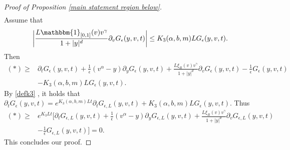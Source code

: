 \documentclass[11pt]{article}
\numberwithin{equation}{section}
\begin{document}
\begin{proof}[Proof of Proposition \ref{main statement region below}]
\begin{align*}
\end{align*}
Assume that 
\begin{align}\label{bound derivative by function}
    \bigg|\frac{L\mathbbm{1}_{[0,1]}(v)v^{\gamma}}{1+|y|^{d}}\partial_{v}G_{\epsilon}(y,v,t)\bigg|\leq K_{3}(\alpha,b,m)L G_{\epsilon}(y,v,t).
\end{align}
Then 
\begin{align*}
    (\ast) \geq &\partial_{t}G_{\epsilon}(y,v,t)+\frac{1}{\epsilon}(v^{\alpha}-y)\partial_{y}G_{\epsilon}(y,v,t)+\frac{L\xi_{R}(v)v^{\gamma}}{1+|y|^{d}}\partial_{v}G_{\epsilon}(y,v,t)-\frac{1}{\epsilon}G_{\epsilon}(y,v,t)\\
    &-K_{3}(\alpha,b,m)LG_{\epsilon}(y,v,t).
\end{align*}
By \eqref{defk3} , it holds that $\partial_{t}G_{\epsilon}(y,v,t)=e^{K_{3}(\alpha,b,m)Lt}\partial_{t}G_{\epsilon,L}(y,v,t)+K_{3}(\alpha,b,m)LG_{\epsilon}(y,v,t)$. Thus
\begin{align*}
    (\ast) \geq &e^{K_{3}Lt}\bigg[\partial_{t}G_{\epsilon,L}(y,v,t)+\frac{1}{\epsilon}(v^{\alpha}-y)\partial_{y}G_{\epsilon,L}(y,v,t)+\frac{L\xi_{R}(v)v^{\gamma}}{1+|y|^{d}}\partial_{v}G_{\epsilon,L}(y,v,t)\\
    &-\frac{1}{\epsilon}G_{\epsilon,L}(y,v,t)\bigg]= 0.
\end{align*}
This concludes our proof. 


\end{proof}
\end{document}
